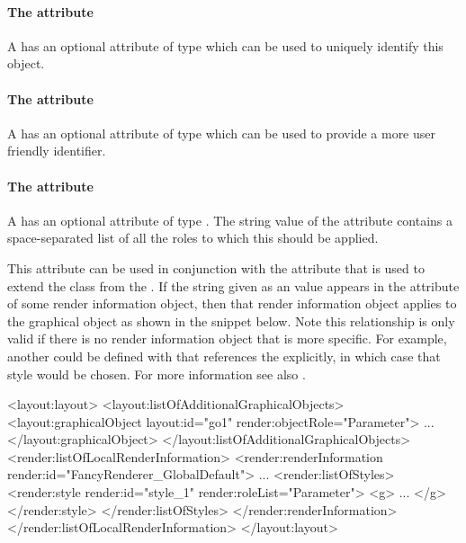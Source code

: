 \paragraph{The \fixttspace{} attribute}

A \Style has an optional attribute  of type  which can be used to uniquely identify this \Style object.

\paragraph{The \fixttspace{} attribute}

A \Style has an optional attribute  of type
 which can be used to provide a more user friendly identifier.

\paragraph{The \fixttspace{} attribute}

A \Style has an optional attribute  of type
. The string value of the  attribute contains 
a space-separated list of all the roles to which this \Style should be applied.

This attribute can be  used in conjunction with the  attribute 
that is used to extend the \GraphicalObject class from the \LayoutPackage. If 
the string given as an  value appears in the  
attribute of some render information object, then that render information object
applies to the graphical object as shown in the snippet below. Note this 
relationship is only valid if there is no render information object that is more 
specific. For example, another \LocalStyle could be defined with  
that references the  explicitly, in which case that style 
would be  chosen. For more information see also . 

{\footnotesize
\begin{example}
<layout:layout>
   <layout:listOfAdditionalGraphicalObjects>
      <layout:graphicalObject layout:id="go1" render:objectRole="Parameter">
         ...
      </layout:graphicalObject>
   </layout:listOfAdditionalGraphicalObjects>
   <render:listOfLocalRenderInformation>
      <render:renderInformation render:id="FancyRenderer_GlobalDefault">
             ...
        <render:listOfStyles>
             <render:style render:id="style_1" render:roleList="Parameter">
                <g> ... </g>
             </render:style> 
        </render:listOfStyles>
      </render:renderInformation>
   </render:listOfLocalRenderInformation>
</layout:layout>
\end{example}
}


